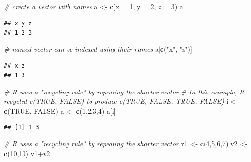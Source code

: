 \documentclass[]{book}
\newenvironment{Shaded}{\begin{snugshade}}{\end{snugshade}}
\newcommand{\KeywordTok}[1]{\textcolor[rgb]{0.13,0.29,0.53}{\textbf{{#1}}}}
\newcommand{\DataTypeTok}[1]{\textcolor[rgb]{0.13,0.29,0.53}{{#1}}}
\newcommand{\DecValTok}[1]{\textcolor[rgb]{0.00,0.00,0.81}{{#1}}}
\newcommand{\StringTok}[1]{\textcolor[rgb]{0.31,0.60,0.02}{{#1}}}
\newcommand{\CommentTok}[1]{\textcolor[rgb]{0.56,0.35,0.01}{\textit{{#1}}}}
\newcommand{\OtherTok}[1]{\textcolor[rgb]{0.56,0.35,0.01}{{#1}}}
\newcommand{\NormalTok}[1]{{#1}}
\begin{document}
\begin{Shaded}
\begin{Highlighting}[]
\CommentTok{# create a vector with names}
\NormalTok{a <-}\StringTok{ }\KeywordTok{c}\NormalTok{(}\DataTypeTok{x =} \DecValTok{1}\NormalTok{, }\DataTypeTok{y =} \DecValTok{2}\NormalTok{, }\DataTypeTok{z =} \DecValTok{3}\NormalTok{)}
\NormalTok{a}
\end{Highlighting}
\end{Shaded}

\begin{verbatim}
## x y z 
## 1 2 3
\end{verbatim}

\begin{Shaded}
\begin{Highlighting}[]
\CommentTok{# named vector can be indexed using their names}
\NormalTok{a[}\KeywordTok{c}\NormalTok{(}\StringTok{"x"}\NormalTok{, }\StringTok{"z"}\NormalTok{)]}
\end{Highlighting}
\end{Shaded}

\begin{verbatim}
## x z 
## 1 3
\end{verbatim}

\begin{Shaded}
\begin{Highlighting}[]
\CommentTok{# R uses a "recycling rule" by repeating the shorter vector}
\CommentTok{# In this example, R recycled c(TRUE, FALSE) to produce c(TRUE, FALSE, TRUE, FALSE)}
\NormalTok{i <-}\StringTok{ }\KeywordTok{c}\NormalTok{(}\OtherTok{TRUE}\NormalTok{, }\OtherTok{FALSE}\NormalTok{)}
\NormalTok{a <-}\StringTok{ }\KeywordTok{c}\NormalTok{(}\DecValTok{1}\NormalTok{,}\DecValTok{2}\NormalTok{,}\DecValTok{3}\NormalTok{,}\DecValTok{4}\NormalTok{)}
\NormalTok{a[i]}
\end{Highlighting}
\end{Shaded}

\begin{verbatim}
## [1] 1 3
\end{verbatim}

\begin{Shaded}
\begin{Highlighting}[]
\CommentTok{# R uses a "recycling rule" by repeating the shorter vector}
\NormalTok{v1 <-}\StringTok{ }\KeywordTok{c}\NormalTok{(}\DecValTok{4}\NormalTok{,}\DecValTok{5}\NormalTok{,}\DecValTok{6}\NormalTok{,}\DecValTok{7}\NormalTok{)}
\NormalTok{v2 <-}\StringTok{ }\KeywordTok{c}\NormalTok{(}\DecValTok{10}\NormalTok{,}\DecValTok{10}\NormalTok{)}
\NormalTok{v1+v2}
\end{Highlighting}
\end{Shaded}
\end{document}
